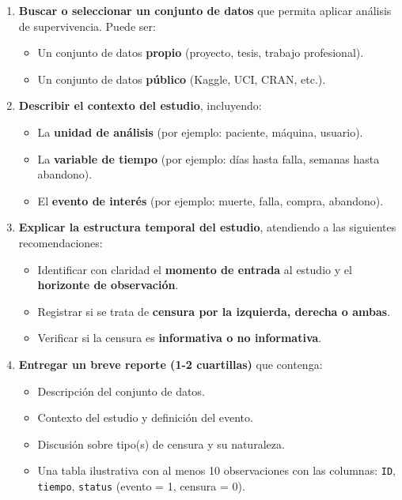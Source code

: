 \documentclass[
  letterpaper,
  DIV=11,
  numbers=noendperiod]{scrartcl}
\providecommand{\tightlist}{%
  \setlength{\itemsep}{0pt}\setlength{\parskip}{0pt}}
\begin{document}
\begin{enumerate}
\def\labelenumi{\arabic{enumi}.}
\item
  \textbf{Buscar o seleccionar un conjunto de datos} que permita aplicar
  análisis de supervivencia. Puede ser:

  \begin{itemize}
  \tightlist
  \item
    Un conjunto de datos \textbf{propio} (proyecto, tesis, trabajo
    profesional).
  \item
    Un conjunto de datos \textbf{público} (Kaggle, UCI, CRAN, etc.).
  \end{itemize}
\item
  \textbf{Describir el contexto del estudio}, incluyendo:

  \begin{itemize}
  \tightlist
  \item
    La \textbf{unidad de análisis} (por ejemplo: paciente, máquina,
    usuario).
  \item
    La \textbf{variable de tiempo} (por ejemplo: días hasta falla,
    semanas hasta abandono).
  \item
    El \textbf{evento de interés} (por ejemplo: muerte, falla, compra,
    abandono).
  \end{itemize}
\item
  \textbf{Explicar la estructura temporal del estudio}, atendiendo a las
  siguientes recomendaciones:

  \begin{itemize}
  \tightlist
  \item
    Identificar con claridad el \textbf{momento de entrada} al estudio y
    el \textbf{horizonte de observación}.
  \item
    Registrar si se trata de \textbf{censura por la izquierda, derecha o
    ambas}.
  \item
    Verificar si la censura es \textbf{informativa o no informativa}.
  \end{itemize}
\item
  \textbf{Entregar un breve reporte (1-2 cuartillas)} que contenga:

  \begin{itemize}
  \tightlist
  \item
    Descripción del conjunto de datos.
  \item
    Contexto del estudio y definición del evento.
  \item
    Discusión sobre tipo(s) de censura y su naturaleza.
  \item
    Una tabla ilustrativa con al menos 10 observaciones con las
    columnas: \texttt{ID}, \texttt{tiempo}, \texttt{status} (evento = 1,
    censura = 0).
  \end{itemize}
\end{enumerate}
\end{document}
